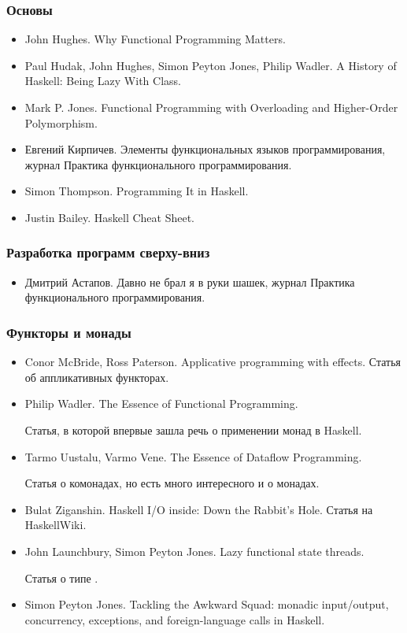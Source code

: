 
\subsubsection{Основы}

\begin{itemize}
\item
  John Hughes. Why Functional Programming Matters.
\item
  Paul Hudak, John Hughes, Simon Peyton Jones, Philip Wadler. A History
  of Haskell: Being Lazy With Class.
\item
  Mark P. Jones. Functional Programming with Overloading and
  Higher-Order Polymorphism.
\item
  Евгений Кирпичев. Элементы функциональных языков программирования,
  журнал Практика функционального программирования.
\item
  Simon Thompson. Programming It in Haskell.
\item
  Justin Bailey. Haskell Cheat Sheet.
\end{itemize}

\subsubsection{Разработка программ сверху-вниз}

\begin{itemize}
\item
  Дмитрий Астапов. Давно не брал я в руки шашек, журнал Практика
  функционального программирования.
\end{itemize}

\subsubsection{Функторы и монады}

\begin{itemize}
\item
  Conor McBride, Ross Paterson. Applicative programming with effects.
  Статья об аппликативных функторах.
\item
  Philip Wadler. The Essence of Functional Programming.

  Статья, в которой впервые зашла речь о применении монад в Haskell.
\item
  Tarmo Uustalu, Varmo Vene. The Essence of Dataflow Programming.

  Статья о комонадах, но есть много интересного и о монадах.
\item
  Bulat Ziganshin. Haskell I/O inside: Down the Rabbit's Hole. Статья на
  HaskellWiki.
\item
  John Launchbury, Simon Peyton Jones. Lazy functional state threads.

  Статья о типе .
\item
  Simon Peyton Jones. Tackling the Awkward Squad: monadic input/output,
  concurrency, exceptions, and foreign-language calls in Haskell.
\end{itemize}

